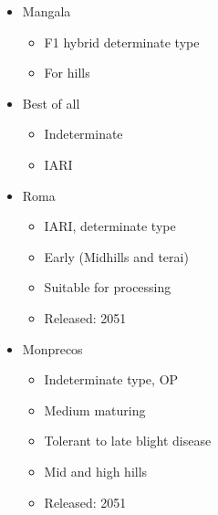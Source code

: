 \documentclass[
  ignorenonframetext,
  aspectratio=169]{beamer}
\providecommand{\tightlist}{%
  \setlength{\itemsep}{0pt}\setlength{\parskip}{0pt}}
\begin{document}
\begin{frame}{}
\protect\hypertarget{section-1}{}
\begin{itemize}
\tightlist
\item
  Mangala

  \begin{itemize}
  \tightlist
  \item
    F1 hybrid determinate type
  \item
    For hills
  \end{itemize}
\item
  Best of all

  \begin{itemize}
  \tightlist
  \item
    Indeterminate
  \item
    IARI
  \end{itemize}
\item
  Roma

  \begin{itemize}
  \tightlist
  \item
    IARI, determinate type
  \item
    Early (Midhills and terai)
  \item
    Suitable for processing
  \item
    Released: 2051
  \end{itemize}
\item
  Monprecos

  \begin{itemize}
  \tightlist
  \item
    Indeterminate type, OP
  \item
    Medium maturing
  \item
    Tolerant to late blight disease
  \item
    Mid and high hills
  \item
    Released: 2051
  \end{itemize}
\end{itemize}
\end{frame}
\end{document}
